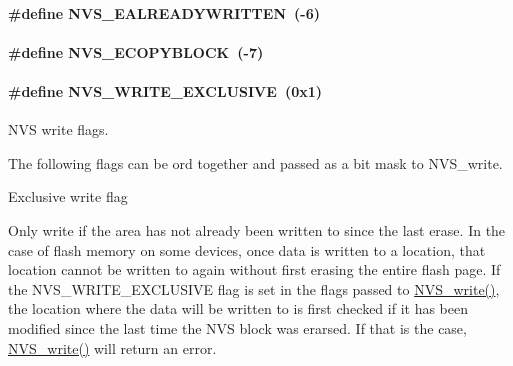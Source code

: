 \paragraph[{N\+V\+S\+\_\+\+E\+A\+L\+R\+E\+A\+D\+Y\+W\+R\+I\+T\+T\+E\+N}]{\setlength{\rightskip}{0pt plus 5cm}\#define N\+V\+S\+\_\+\+E\+A\+L\+R\+E\+A\+D\+Y\+W\+R\+I\+T\+T\+E\+N~(-\/6)}\label{_n_v_s_8h_a4db9b4f738a4b5439ab742060ad53ebd}
\paragraph[{N\+V\+S\+\_\+\+E\+C\+O\+P\+Y\+B\+L\+O\+C\+K}]{\setlength{\rightskip}{0pt plus 5cm}\#define N\+V\+S\+\_\+\+E\+C\+O\+P\+Y\+B\+L\+O\+C\+K~(-\/7)}\label{_n_v_s_8h_a946508ac9e10fec555f9ba4926fdce62}
\paragraph[{N\+V\+S\+\_\+\+W\+R\+I\+T\+E\+\_\+\+E\+X\+C\+L\+U\+S\+I\+V\+E}]{\setlength{\rightskip}{0pt plus 5cm}\#define N\+V\+S\+\_\+\+W\+R\+I\+T\+E\+\_\+\+E\+X\+C\+L\+U\+S\+I\+V\+E~(0x1)}\label{_n_v_s_8h_ab3235132a5cebc663aee601e238b8d98}


N\+V\+S write flags. 

The following flags can be or\textquotesingle{}d together and passed as a bit mask to N\+V\+S\+\_\+write.

Exclusive write flag

Only write if the area has not already been written to since the last erase. In the case of flash memory on some devices, once data is written to a location, that location cannot be written to again without first erasing the entire flash page. If the N\+V\+S\+\_\+\+W\+R\+I\+T\+E\+\_\+\+E\+X\+C\+L\+U\+S\+I\+V\+E flag is set in the flags passed to \hyperlink{_n_v_s_8h_a2c0acbdec0a65dc725019adb65ad282a}{N\+V\+S\+\_\+write()}, the location where the data will be written to is first checked if it has been modified since the last time the N\+V\+S block was erarsed. If that is the case, \hyperlink{_n_v_s_8h_a2c0acbdec0a65dc725019adb65ad282a}{N\+V\+S\+\_\+write()} will return an error. 

